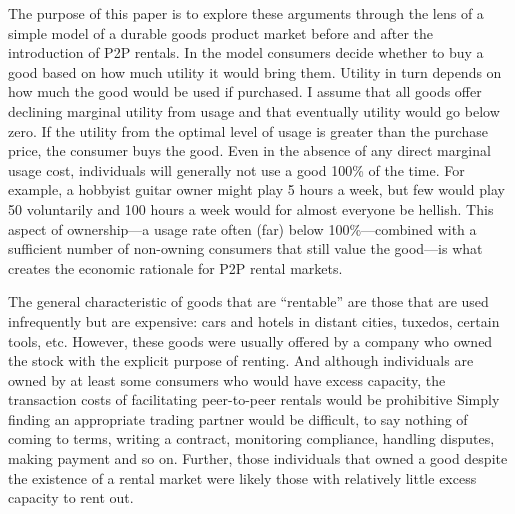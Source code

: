 \documentclass[11pt]{article}
\begin{document}

The purpose of this paper is to explore these arguments through the lens of a simple model of a durable goods product market before and after the introduction of P2P rentals. 
In the model consumers decide whether to buy a good based on how much utility it would bring them. 
Utility in turn depends on how much the good would be used if purchased.
I assume that all goods offer declining marginal utility from usage and that eventually utility would go below zero. 
If the utility from the optimal level of usage is greater than the purchase price, the consumer buys the good. 
Even in the absence of any direct marginal usage cost, individuals will generally not use a good 100\% of the time. 
For example, a hobbyist guitar owner might play 5 hours a week, but few would play 50 voluntarily and 100 hours a week would for almost everyone be hellish.
This aspect of ownership---a usage rate often (far) below 100\%---combined with a sufficient number of non-owning consumers that still value the good---is what creates the economic rationale for P2P rental markets.      

The general characteristic of goods that are ``rentable'' are those that are used infrequently but are expensive: 
cars and hotels in distant cities, tuxedos, certain tools, etc.
However, these goods were usually offered by a company who owned the stock with the explicit purpose of renting.  
And although individuals are owned by at least some consumers who would have excess capacity, the transaction costs of facilitating peer-to-peer rentals would be prohibitive
Simply finding an appropriate trading partner would be difficult, to say nothing of coming to terms, writing a contract, monitoring compliance, handling disputes, making payment and so on. 
Further, those individuals that owned a good despite the existence of a rental market were likely those with relatively little excess capacity to rent out. 
\end{document}
